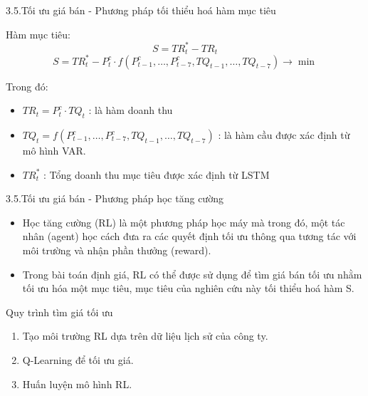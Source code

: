 \documentclass{beamer}
\begin{document}
	\begin{frame}{3.5.Tối ưu giá bán - Phương pháp tối thiểu hoá hàm mục tiêu}
		\begin{block}{Hàm mục tiêu:}
		\[
		S = TR_t^*-TR_t 
		\]
		\[
		S = TR_t^* - P_t^c \cdot f(P_{t-1}^c, \dots, P_{t-7}^c, TQ_{t-1}, \dots, TQ_{t-7}) \to \min
		\]
		\end{block}


		
		Trong đó:\\
		\begin{itemize}
			\item $TR_t = P_t^c \cdot TQ_t$ : là hàm doanh thu\\
		    \item $TQ_t = f(P_{t-1}^c, \dots, P_{t-7}^c, TQ_{t-1}, \dots, TQ_{t-7})$ : là hàm cầu được xác định từ mô hình VAR.\\
		    \item $TR_t^*$ : Tổng doanh thu mục tiêu được xác định từ LSTM
       \end{itemize}
	\end{frame}
	

	\begin{frame}{3.5.Tối ưu giá bán - Phương pháp học tăng cường}
		\begin{itemize}
			\item Học tăng cường (RL) là một phương pháp học máy mà trong đó, một tác nhân (agent) học cách đưa ra các quyết định tối ưu thông qua tương tác với môi trường và nhận phần thưởng (reward). 
			\item Trong bài toán định giá, RL có thể được sử dụng để tìm giá bán tối ưu nhằm tối ưu hóa một mục tiêu, mục tiêu của nghiên cứu này tối thiểu hoá hàm S.
		\end{itemize}
		\begin{block}{Quy trình tìm giá tối ưu}
			\begin{enumerate}
			   \item Tạo môi trường RL dựa trên dữ liệu lịch sử của công ty.
			   \item Q-Learning để tối ưu giá.
			   \item Huấn luyện mô hình RL.
			 \end{enumerate}
		\end{block}
	\end{frame}
\end{document}
